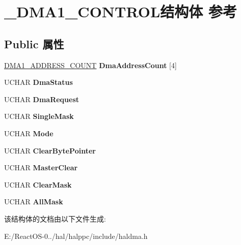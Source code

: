 \hypertarget{struct___d_m_a1___c_o_n_t_r_o_l}{}\section{\+\_\+\+D\+M\+A1\+\_\+\+C\+O\+N\+T\+R\+O\+L结构体 参考}
\label{struct___d_m_a1___c_o_n_t_r_o_l}
\subsection*{Public 属性}
\begin{DoxyCompactItemize}
\item 
\mbox{\label{struct___d_m_a1___c_o_n_t_r_o_l_a6a1242d34f47102b8da960ed023281e3}} 
\hyperlink{struct___d_m_a1___a_d_d_r_e_s_s___c_o_u_n_t}{D\+M\+A1\+\_\+\+A\+D\+D\+R\+E\+S\+S\+\_\+\+C\+O\+U\+NT} {\bfseries Dma\+Address\+Count} \mbox{[}4\mbox{]}
\item 
\mbox{\label{struct___d_m_a1___c_o_n_t_r_o_l_a9bceab2cbf2a0608460aff2b94585113}} 
U\+C\+H\+AR {\bfseries Dma\+Status}
\item 
\mbox{\label{struct___d_m_a1___c_o_n_t_r_o_l_a87eca37f57f3376000df9641348acbc0}} 
U\+C\+H\+AR {\bfseries Dma\+Request}
\item 
\mbox{\label{struct___d_m_a1___c_o_n_t_r_o_l_af66b99535989641300ac2d976605d55e}} 
U\+C\+H\+AR {\bfseries Single\+Mask}
\item 
\mbox{\label{struct___d_m_a1___c_o_n_t_r_o_l_a98c1caf741169a03076447fc1f50c537}} 
U\+C\+H\+AR {\bfseries Mode}
\item 
\mbox{\label{struct___d_m_a1___c_o_n_t_r_o_l_a260462ca8c478e176be1cb2f33ed6a04}} 
U\+C\+H\+AR {\bfseries Clear\+Byte\+Pointer}
\item 
\mbox{\label{struct___d_m_a1___c_o_n_t_r_o_l_a2d68ebdfab54edcb5ce4645b54bee4ae}} 
U\+C\+H\+AR {\bfseries Master\+Clear}
\item 
\mbox{\label{struct___d_m_a1___c_o_n_t_r_o_l_a8d679f1e8c325dd9bd02f15a082542ad}} 
U\+C\+H\+AR {\bfseries Clear\+Mask}
\item 
\mbox{\label{struct___d_m_a1___c_o_n_t_r_o_l_a012f8410a614d026bde9d8fc40d68b90}} 
U\+C\+H\+AR {\bfseries All\+Mask}
\end{DoxyCompactItemize}


该结构体的文档由以下文件生成\+:\begin{DoxyCompactItemize}
\item 
E\+:/\+React\+O\+S-\/0../hal/halppc/include/haldma.\+h\end{DoxyCompactItemize}
